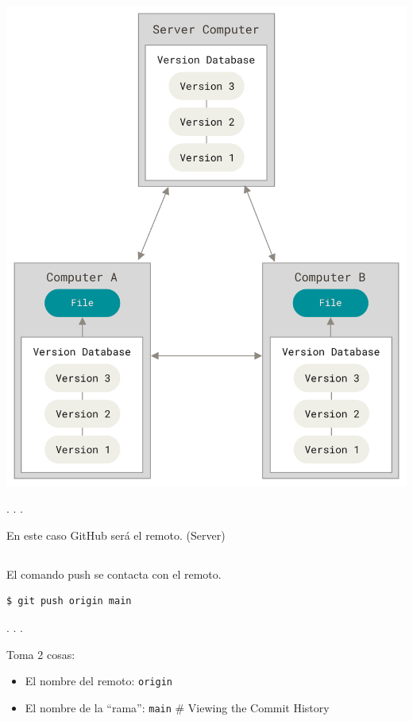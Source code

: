 \includegraphics{figs/distributed.png}

. . .

En este caso GitHub será el remoto. (Server)

\subsection{}

El comando push se contacta con el remoto.

\begin{lstlisting}
$ git push origin main
\end{lstlisting}

. . .

Toma 2 cosas:

\begin{itemize}
\tightlist
\item
  El nombre del remoto: \passthrough{\lstinline!origin!}
\item
  El nombre de la ``rama'': \passthrough{\lstinline!main!} \# Viewing
  the Commit History
\end{itemize}

